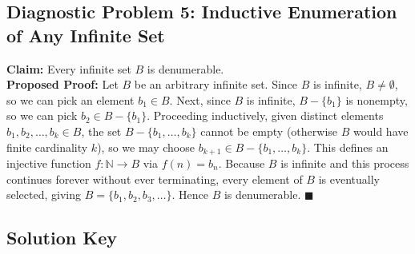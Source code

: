 \documentclass[11pt, letterpaper]{article}
\theoremstyle{definition}
\theoremstyle{remark}
\begin{document}
\subsection{Diagnostic Problem 5: Inductive Enumeration of Any Infinite Set}
\textbf{Claim:} Every infinite set $B$ is denumerable.\\
\textbf{Proposed Proof:} Let $B$ be an arbitrary infinite set. Since $B$ is infinite, $B \neq \emptyset$, so we can pick an element $b_1 \in B$. Next, since $B$ is infinite, $B - \{b_1\}$ is nonempty, so we can pick $b_2 \in B - \{b_1\}$. Proceeding inductively, given distinct elements $b_1, b_2, \dots, b_k \in B$, the set $B - \{b_1, \dots, b_k\}$ cannot be empty (otherwise $B$ would have finite cardinality $k$), so we may choose $b_{k+1} \in B - \{b_1, \dots, b_k\}$. This defines an injective function $f : \mathbb{N} \to B$ via $f(n) = b_n$. Because $B$ is infinite and this process continues forever without ever terminating, every element of $B$ is eventually selected, giving $B = \{b_1, b_2, b_3, \dots\}$. Hence $B$ is denumerable. $\blacksquare$

\subsection{Solution Key}
\end{document}
